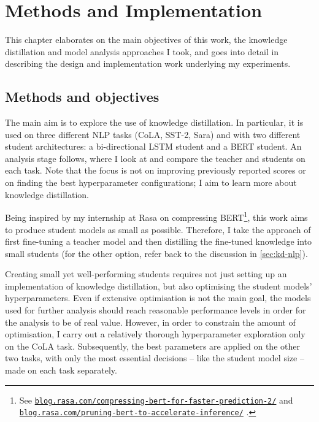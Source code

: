 \documentclass[bsc,frontabs,singlespacing,parskip,deptreport]{infthesis}
\newcommand\rurl[1]{%
  \href{https://#1}{\nolinkurl{#1}}%
}
\begin{document}
\chapter{Methods and Implementation}{
  \label{chap:methods-implementation}

  This chapter elaborates on the main objectives of this work, the knowledge distillation and model analysis approaches I took, and goes into detail in describing the design and implementation work underlying my experiments.

  \section{Methods and objectives}{
    \label{sec:methods}
    The main aim is to explore the use of knowledge distillation. In particular, it is used on three different NLP tasks (CoLA, SST-2, Sara) and with two different student architectures: a bi-directional LSTM student and a BERT student. An analysis stage follows, where I look at and compare the teacher and students on each task. 
    Note that the focus is not on improving previously reported scores or on finding the best hyperparameter configurations; I aim to learn more about knowledge distillation.

    Being inspired by my internship at Rasa on compressing BERT\footnote{See \rurl{blog.rasa.com/compressing-bert-for-faster-prediction-2/} and \rurl{blog.rasa.com/pruning-bert-to-accelerate-inference/}.}, this work aims to produce student models as small as possible.
    Therefore, I take the approach of first fine-tuning a teacher model and then distilling the fine-tuned knowledge into small students (for the other option, refer back to the discussion in \autoref{sec:kd-nlp}).

    Creating small yet well-performing students requires not just setting up an implementation of knowledge distillation, but also optimising the student models' hyperparameters.
    Even if extensive optimisation is not the main goal, the models used for further analysis should reach reasonable performance levels in order for the analysis to be of real value.
    However, in order to constrain the amount of optimisation, I carry out a relatively thorough hyperparameter exploration only on the CoLA task. 
    Subsequently, the best parameters are applied on the other two tasks, with only the most essential decisions -- like the student model size -- made on each task separately.

}}
\end{document}
